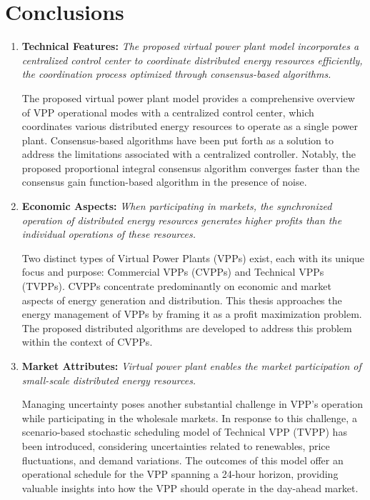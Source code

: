 \documentclass
    [phd,synopsis]
    {iitmdissertation}
\begin{document}
\section{Conclusions}
\begin{enumerate}
    \item \textbf{Technical Features:} \textit{The proposed virtual power plant model incorporates a centralized control center to coordinate distributed energy resources efficiently, the coordination process optimized through consensus-based algorithms.}
    
    \vspace{0.5cm}    
    The proposed virtual power plant model provides a comprehensive overview of VPP operational modes with a centralized control center, which coordinates various distributed energy resources to operate as a single power plant. Consensus-based algorithms have been put forth as a solution to address the limitations associated with a centralized controller. Notably, the proposed proportional integral consensus algorithm converges faster than the consensus gain function-based algorithm in the presence of noise.
     
    \item \textbf{Economic Aspects:} \textit{When participating in markets, the synchronized operation of distributed energy resources generates higher profits than the individual operations of these resources.} 
    
     \vspace{0.5cm}
    Two distinct types of Virtual Power Plants (VPPs) exist, each with its unique focus and purpose: Commercial VPPs (CVPPs) and Technical VPPs (TVPPs). CVPPs concentrate predominantly on economic and market aspects of energy generation and distribution. This thesis approaches the energy management of VPPs by framing it as a profit maximization problem. The proposed distributed algorithms are developed to address this problem within the context of CVPPs.     
   
    \item \textbf{Market Attributes:} \textit{Virtual power plant enables the market participation of small-scale distributed energy resources.}
    
    \vspace{0.5cm}
    Managing uncertainty poses another substantial challenge in VPP's operation while participating in the wholesale markets. In response to this challenge, a scenario-based stochastic scheduling model of Technical VPP (TVPP) has been introduced, considering uncertainties related to renewables, price fluctuations, and demand variations. The outcomes of this model offer an operational schedule for the VPP spanning a 24-hour horizon, providing valuable insights into how the VPP should operate in the day-ahead market.        
\end{enumerate}
\end{document}
